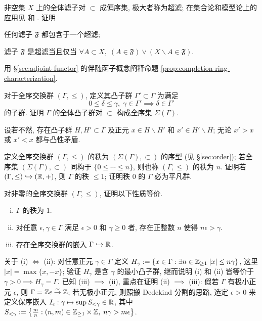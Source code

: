 \begin{Exercises}
	\item 非空集 $X$ 上的全体滤子对 $\subset$ 成偏序集, 极大者称为超滤; 在集合论和模型论上的应用见 \cite[\S 7]{Je03} 和 \cite[\S 5.4]{Feng17}. 证明
		\begin{compactenum}[(i)]
			\item 任何滤子 $\mathfrak{F}$ 都包含于一个超滤;
			\item 滤子 $\mathfrak{F}$ 是超滤当且仅当 $\forall A \subset X, \; (A \in \mathfrak{F}) \vee (X \smallsetminus A \in \mathfrak{F})$.
		\end{compactenum}
	\item 用 \S\ref{sec:adjoint-functor} 的伴随函子概念阐释命题 \ref{prop:completion-ring-characterization}.
	\item 对于全序交换群 $(\Gamma, \leq)$, 定义其凸子群 $\Gamma' \subset \Gamma$ 为满足
		\[ 0 \leq \delta \leq \gamma, \; \gamma \in \Gamma' \implies \delta \in \Gamma' \]
		的子群. 证明 $\Gamma$ 的全体凸子群对 $\subset$ 构成全序集 $\Sigma(\Gamma)$.
		\begin{hint}
			设若不然, 存在凸子群 $H, H' \subset \Gamma$ 及正元 $x \in H \smallsetminus H'$ 和 $x' \in H' \smallsetminus H$; 无论 $x' > x$ 或 $x' < x$ 都与凸性矛盾.
		\end{hint}
	\item 定义全序交换群 $(\Gamma, \leq)$ 的秩为 $(\Sigma(\Gamma), \subset)$ 的序型 (见 \S\ref{sec:order}); 若全序集 $(\Sigma(\Gamma), \subset)$ 同构于 $\{ 0 \leq \cdots \leq n\}$, 则也称 $(\Gamma, \leq)$ 的秩为 $n$. 证明若 $(\Gamma, \leq) \hookrightarrow (\mathbb{R}, +)$, 则 $\Gamma$ 的秩 $\leq 1$; 证明秩 $0$ 的 $\Gamma$ 必为平凡群.
	\item 对非零的全序交换群 $(\Gamma, \leq)$, 证明以下性质等价.
		\begin{enumerate}[(i)]
			\item $\Gamma$ 的秩为 $1$.
			\item 对任意 $\epsilon, \gamma \in \Gamma$ 满足 $\epsilon > 0$ 和 $\gamma \geq 0$ 者, 存在正整数 $n$ 使得 $n\epsilon > \gamma$.
			\item 存在全序交换群的嵌入 $\Gamma \hookrightarrow \mathbb{R}$.
		\end{enumerate} %
		\begin{hint}
			关于 (i) $\iff$ (ii): 对任意正元 $\gamma \in \Gamma$ 定义 $H_\gamma := \left\{x \in \Gamma: \exists n \in \mathbb{Z}_{\geq 1}\; |x| \leq n\gamma \right\}$, 这里 $|x|=\max\{x,-x\}$; 验证 $H_\gamma$ 是含 $\gamma$ 的最小凸子群, 继而说明 (i) 和 (ii) 皆等价于 $\gamma > 0 \implies H_\gamma = \Gamma$. 已知 (iii) $\implies$ (ii), 重点在证明 (ii) $\implies$ (iii): 假若 $\Gamma$ 有极小正元 $\epsilon$, 则 $\Gamma = \mathbb{Z}\epsilon \stackrel{\sim}{\rightarrow} \mathbb{Z}$; 若无极小正元, 则照搬 Dedekind 分割的思路, 选定 $\epsilon > 0$ 来定义保序嵌入 $I_\epsilon: \gamma \mapsto \sup S_{< \gamma} \in \mathbb{R}$, 其中 $S_{<\gamma} := \left\{ \frac{m}{n} : (n,m) \in \mathbb{Z}_{\geq 1} \times \mathbb{Z}, \; n\gamma > m\epsilon \right\}$. 

\end{hint}
\end{Exercises}
